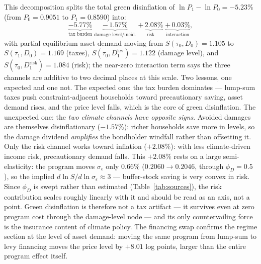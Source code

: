 \documentclass[12pt]{article}
\newcommand{\Sfun}{S}
\begin{document}
This decomposition splits the total green disinflation of
$\ln P_1 - \ln P_0 = -5.23\%$ (from $P_0 = 0.9051$ to $P_1 = 0.8590$)
into:
\[
\underbrace{-5.77\%}_{\text{tax burden}}
\;\underbrace{-\,1.57\%}_{\text{damage level/incid.}}
\;\underbrace{+\,2.08\%}_{\text{risk}}
\;\underbrace{+\,0.03\%}_{\text{interaction}},
\]
with partial-equilibrium asset demand moving from $S(\tau_0, D_0) = 1.105$
to $S(\tau_1, D_0) = 1.169$ (taxes), $S(\tau_0, D_1^{\mathrm{lev}}) =
1.122$ (damage level), and $S(\tau_0, D_1^{\mathrm{risk}}) = 1.084$
(risk); the near-zero interaction term says the three channels are
additive to two decimal places at this scale. Two lessons, one expected
and one not. The expected one: the tax
burden dominates --- lump-sum taxes push constraint-adjacent households
toward precautionary saving, asset demand rises, and the price level
falls, which is the core of green disinflation. The unexpected one: the
\emph{two climate channels have opposite signs}. Avoided damages are
themselves disinflationary ($-1.57\%$): richer households save more in
levels, so the damage dividend \emph{amplifies} the bondholder windfall
rather than offsetting it. Only the risk channel works toward inflation
($+2.08\%$): with less climate-driven income risk, precautionary demand
falls. This $+2.08\%$ rests on a large semi-elasticity: the program moves
$\sigma_\epsilon$ only $0.66\%$ ($0.2060\to0.2046$, through $\phi_D=0.5$),
so the implied $d\ln\Sfun/d\ln\sigma_\epsilon\approx3$ --- buffer-stock
saving is very convex in risk. Since $\phi_D$ is swept rather than estimated
(Table~\ref{tab:sources}), the risk contribution scales roughly linearly
with it and should be read as an axis, not a point.
Green disinflation is therefore not a tax artifact --- it survives
even at zero program cost through the damage-level node --- and its only
countervailing force is the insurance content of climate policy. The
financing swap confirms the regime section at the level of asset demand:
moving the same program from lump-sum to levy financing moves the price
level by $+8.01$ log points, larger than the entire program effect
itself.
\end{document}

